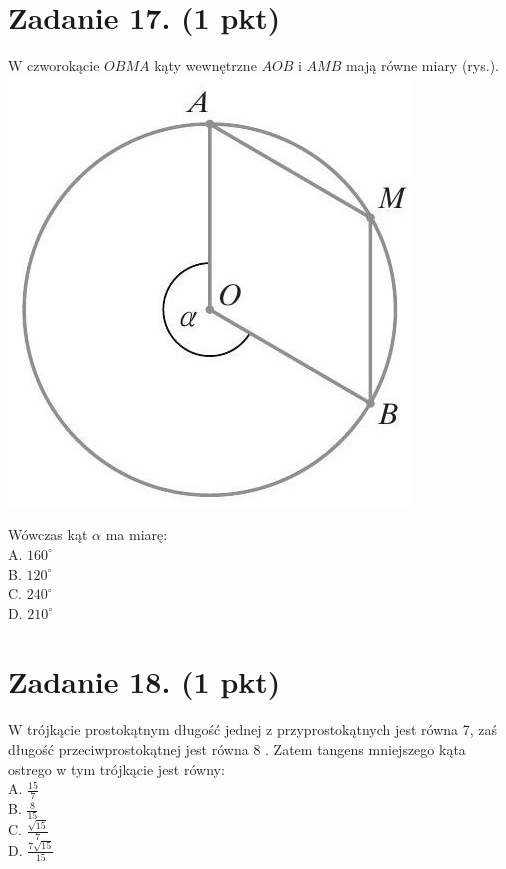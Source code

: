 \documentclass[10pt]{article}
\begin{document}
\section*{Zadanie 17. (1 pkt)}
W czworokącie \(O B M A\) kąty wewnętrzne \(A O B\) i \(A M B\) mają równe miary (rys.).\\
\includegraphics[max width=\textwidth, center]{2024_11_21_769d5953f978b92e06f5g-06(1)}

Wówczas kąt \(\alpha\) ma miarę:\\
A. \(160^{\circ}\)\\
B. \(120^{\circ}\)\\
C. \(240^{\circ}\)\\
D. \(210^{\circ}\)

\section*{Zadanie 18. (1 pkt)}
W trójkącie prostokątnym długość jednej z przyprostokątnych jest równa 7, zaś długość przeciwprostokątnej jest równa 8 . Zatem tangens mniejszego kąta ostrego w tym trójkącie jest równy:\\
A. \(\frac{15}{7}\)\\
B. \(\frac{8}{15}\)\\
C. \(\frac{\sqrt{15}}{7}\)\\
D. \(\frac{7 \sqrt{15}}{15}\)
\end{document}
